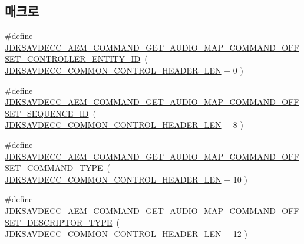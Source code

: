 \subsection*{매크로}
\begin{DoxyCompactItemize}
\item 
\#define \hyperlink{group__command__get__audio__map_gad82c059e9b0495ef3231aa07e1fb5f95}{J\+D\+K\+S\+A\+V\+D\+E\+C\+C\+\_\+\+A\+E\+M\+\_\+\+C\+O\+M\+M\+A\+N\+D\+\_\+\+G\+E\+T\+\_\+\+A\+U\+D\+I\+O\+\_\+\+M\+A\+P\+\_\+\+C\+O\+M\+M\+A\+N\+D\+\_\+\+O\+F\+F\+S\+E\+T\+\_\+\+C\+O\+N\+T\+R\+O\+L\+L\+E\+R\+\_\+\+E\+N\+T\+I\+T\+Y\+\_\+\+ID}~( \hyperlink{group__jdksavdecc__avtp__common__control__header_gaae84052886fb1bb42f3bc5f85b741dff}{J\+D\+K\+S\+A\+V\+D\+E\+C\+C\+\_\+\+C\+O\+M\+M\+O\+N\+\_\+\+C\+O\+N\+T\+R\+O\+L\+\_\+\+H\+E\+A\+D\+E\+R\+\_\+\+L\+EN} + 0 )
\item 
\#define \hyperlink{group__command__get__audio__map_gab81bebfa6dc635d74325b2685926d6ea}{J\+D\+K\+S\+A\+V\+D\+E\+C\+C\+\_\+\+A\+E\+M\+\_\+\+C\+O\+M\+M\+A\+N\+D\+\_\+\+G\+E\+T\+\_\+\+A\+U\+D\+I\+O\+\_\+\+M\+A\+P\+\_\+\+C\+O\+M\+M\+A\+N\+D\+\_\+\+O\+F\+F\+S\+E\+T\+\_\+\+S\+E\+Q\+U\+E\+N\+C\+E\+\_\+\+ID}~( \hyperlink{group__jdksavdecc__avtp__common__control__header_gaae84052886fb1bb42f3bc5f85b741dff}{J\+D\+K\+S\+A\+V\+D\+E\+C\+C\+\_\+\+C\+O\+M\+M\+O\+N\+\_\+\+C\+O\+N\+T\+R\+O\+L\+\_\+\+H\+E\+A\+D\+E\+R\+\_\+\+L\+EN} + 8 )
\item 
\#define \hyperlink{group__command__get__audio__map_ga3775044b1a50d6cc09babe6e3dbb0b9b}{J\+D\+K\+S\+A\+V\+D\+E\+C\+C\+\_\+\+A\+E\+M\+\_\+\+C\+O\+M\+M\+A\+N\+D\+\_\+\+G\+E\+T\+\_\+\+A\+U\+D\+I\+O\+\_\+\+M\+A\+P\+\_\+\+C\+O\+M\+M\+A\+N\+D\+\_\+\+O\+F\+F\+S\+E\+T\+\_\+\+C\+O\+M\+M\+A\+N\+D\+\_\+\+T\+Y\+PE}~( \hyperlink{group__jdksavdecc__avtp__common__control__header_gaae84052886fb1bb42f3bc5f85b741dff}{J\+D\+K\+S\+A\+V\+D\+E\+C\+C\+\_\+\+C\+O\+M\+M\+O\+N\+\_\+\+C\+O\+N\+T\+R\+O\+L\+\_\+\+H\+E\+A\+D\+E\+R\+\_\+\+L\+EN} + 10 )
\item 
\#define \hyperlink{group__command__get__audio__map_ga1fc1effdd030f99bd3f435ce86d5e86c}{J\+D\+K\+S\+A\+V\+D\+E\+C\+C\+\_\+\+A\+E\+M\+\_\+\+C\+O\+M\+M\+A\+N\+D\+\_\+\+G\+E\+T\+\_\+\+A\+U\+D\+I\+O\+\_\+\+M\+A\+P\+\_\+\+C\+O\+M\+M\+A\+N\+D\+\_\+\+O\+F\+F\+S\+E\+T\+\_\+\+D\+E\+S\+C\+R\+I\+P\+T\+O\+R\+\_\+\+T\+Y\+PE}~( \hyperlink{group__jdksavdecc__avtp__common__control__header_gaae84052886fb1bb42f3bc5f85b741dff}{J\+D\+K\+S\+A\+V\+D\+E\+C\+C\+\_\+\+C\+O\+M\+M\+O\+N\+\_\+\+C\+O\+N\+T\+R\+O\+L\+\_\+\+H\+E\+A\+D\+E\+R\+\_\+\+L\+EN} + 12 )
\item 

\end{DoxyCompactItemize}
